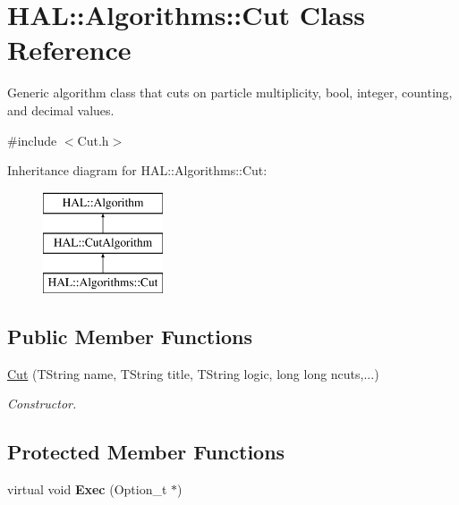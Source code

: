 \hypertarget{class_h_a_l_1_1_algorithms_1_1_cut}{\section{H\+A\+L\+:\+:Algorithms\+:\+:Cut Class Reference}
\label{class_h_a_l_1_1_algorithms_1_1_cut}
}


Generic algorithm class that cuts on particle multiplicity, bool, integer, counting, and decimal values.  




{\ttfamily \#include $<$Cut.\+h$>$}

Inheritance diagram for H\+A\+L\+:\+:Algorithms\+:\+:Cut\+:\begin{figure}[H]
\begin{center}
\leavevmode
\includegraphics[height=3.000000cm]{class_h_a_l_1_1_algorithms_1_1_cut}
\end{center}
\end{figure}
\subsection*{Public Member Functions}
\begin{DoxyCompactItemize}
\item 
\hyperlink{class_h_a_l_1_1_algorithms_1_1_cut_a91f1ee2770d1a90d503cd1b6300dbce2}{Cut} (T\+String name, T\+String title, T\+String logic, long long ncuts,...)
\begin{DoxyCompactList}\small\item\em Constructor. \end{DoxyCompactList}\end{DoxyCompactItemize}
\subsection*{Protected Member Functions}
\begin{DoxyCompactItemize}
\item 
\hypertarget{class_h_a_l_1_1_algorithms_1_1_cut_aa1257616a4912852aa4ce2eb849e2ead}{virtual void {\bfseries Exec} (Option\+\_\+t $\ast$)}\label{class_h_a_l_1_1_algorithms_1_1_cut_aa1257616a4912852aa4ce2eb849e2ead}

\end{DoxyCompactItemize}
